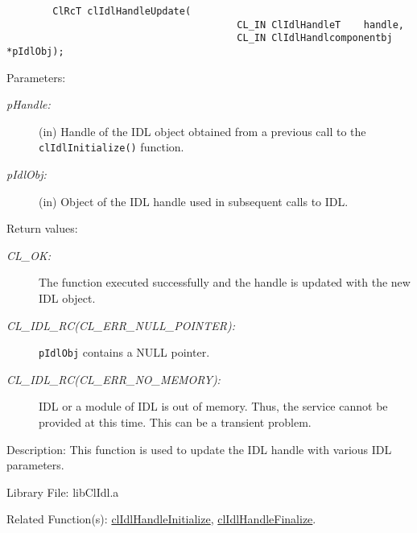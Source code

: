 \begin{flushleft}
\begin{Desc}
\footnotesize\begin{verbatim}        ClRcT clIdlHandleUpdate(
                            			CL_IN ClIdlHandleT    handle,
                		                CL_IN ClIdlHandlcomponentbj *pIdlObj);
\end{verbatim}
\normalsize
\end{Desc}
\begin{Desc}
\item[Parameters:]
\begin{description}
\item[{\em p\-Handle:}](in) Handle of the IDL object obtained from a previous call to the {\tt{clIdlInitialize()}} function.
\item[{\em p\-Idl\-Obj:}] (in) Object of the IDL handle used in subsequent calls to IDL. \end{description}
\end{Desc}
\begin{Desc}
\item[Return values:]
\begin{description}
\item[{\em CL\_\-OK:}]The function executed successfully and the handle is updated with the new IDL object.
\item[{\em CL\_\-IDL\_\-RC(CL\_\-ERR\_\-NULL\_\-POINTER):}]{\tt{pIdlObj}} contains a NULL pointer.
\item[{\em CL\_\-IDL\_\-RC(CL\_\-ERR\_\-NO\_\-MEMORY):}]IDL or a module of IDL is out of memory. Thus, the service cannot be provided at this time. 
This can be a transient problem.
\end{description}
\end{Desc}
\begin{Desc}
\item[Description:]This function is used to update the IDL handle with various IDL parameters. \end{Desc}
\begin{Desc}
\item[Library File:]lib\-Cl\-Idl.a\end{Desc}
\begin{Desc}
\item[Related Function(s):]\hyperlink{pageidl201}{cl\-Idl\-Handle\-Initialize}, \hyperlink{pageidl204}{cl\-Idl\-Handle\-Finalize}. \end{Desc}
\newpage



\end{flushleft}
